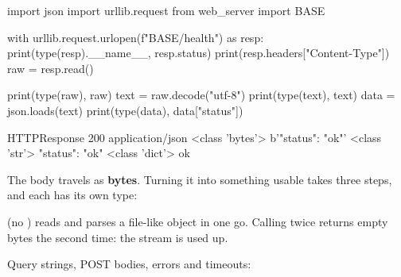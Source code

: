 \begin{pycode}
import json
import urllib.request
from web_server import BASE

with urllib.request.urlopen(f"{BASE}/health") as resp:
    print(type(resp).__name__, resp.status)
    print(resp.headers["Content-Type"])
    raw = resp.read()

print(type(raw), raw)
text = raw.decode("utf-8")
print(type(text), text)
data = json.loads(text)
print(type(data), data["status"])
\end{pycode}
\begin{rawcode}
HTTPResponse 200
application/json
<class 'bytes'> b'{"status": "ok"}'
<class 'str'> {"status": "ok"}
<class 'dict'> ok
\end{rawcode}

\begin{typecheck}
The body travels as \textbf{bytes}. Turning it into something usable takes three steps, and each
has its own type:

\begin{center}
\end{center}
 (no ) reads and parses a file-like object in one go. Calling
 twice returns empty bytes the second time: the stream is used up.
\end{typecheck}

Query strings, POST bodies, errors and timeouts:


